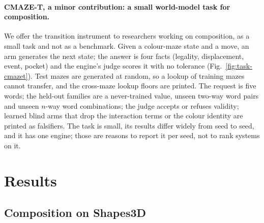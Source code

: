 \documentclass{article} %
\begin{document}
\paragraph{CMAZE-T, a minor contribution: a small world-model task for composition.} We offer the
transition instrument to researchers working on composition, as a small task and not as a benchmark.
Given a colour-maze state and a move, an arm generates the next state; the answer is four facts
(legality, displacement, event, pocket) and the engine's judge scores it with no tolerance
(Fig.~\ref{fig:task-cmazet}). Test mazes are generated at random, so a lookup of training mazes
cannot transfer, and the cross-maze lookup floors are printed. The request is five words; the
held-out families are a never-trained value, unseen two-way word pairs and unseen $n$-way word
combinations; the judge accepts or refuses validity; learned blind arms that drop the interaction
terms or the colour identity are printed as falsifiers. The task is small, its results differ widely from seed to seed, and it has one engine; those are
reasons to report it per seed, not to rank systems on it.

\section{Results}
\label{sec:results}

\subsection{Composition on Shapes3D}
\label{sec:shapes-t7}
\end{document}
